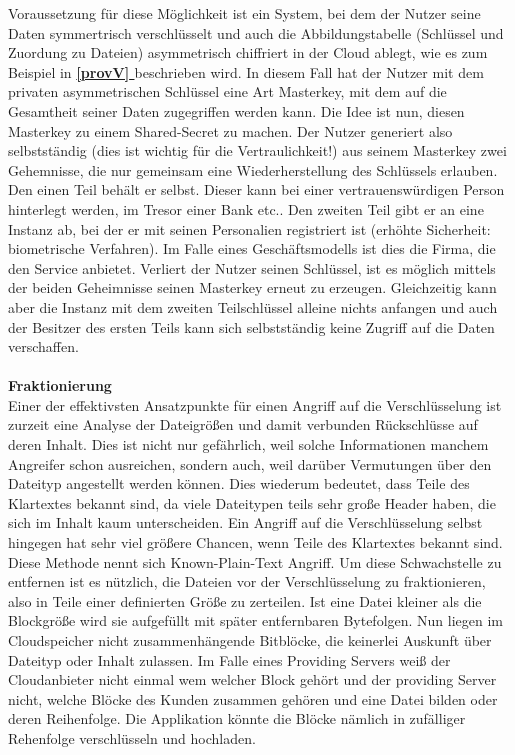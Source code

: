 \documentclass[13pt,a4paper,bibliography=totocnumbered,listof=totocnumbered]{scrartcl}
\newcommand*{\fullref}[1]{\textbf{\hyperref[{#1}]{\ref*{#1} \nameref*{#1}}}}
\begin{document}
Voraussetzung für diese Möglichkeit ist ein System, bei dem der Nutzer seine Daten symmertrisch verschlüsselt und auch die Abbildungstabelle (Schlüssel und Zuordung zu Dateien) asymmetrisch chiffriert in der Cloud ablegt, wie es zum Beispiel in \fullref{provV} beschrieben wird. In diesem Fall hat der Nutzer mit dem privaten asymmetrischen Schlüssel eine Art Masterkey, mit dem auf die Gesamtheit seiner Daten zugegriffen werden kann. Die Idee ist nun, diesen Masterkey zu einem Shared-Secret zu machen. Der Nutzer generiert also selbstständig (dies ist wichtig für die Vertraulichkeit!) aus seinem Masterkey zwei Gehemnisse, die nur gemeinsam eine Wiederherstellung des Schlüssels erlauben. Den einen Teil behält er selbst. Dieser kann bei einer vertrauenswürdigen Person hinterlegt werden, im Tresor einer Bank etc.. Den zweiten Teil gibt er an eine Instanz ab, bei der er mit seinen Personalien registriert ist (erhöhte Sicherheit: biometrische Verfahren). Im Falle eines Geschäftsmodells ist dies die Firma, die den Service anbietet. Verliert der Nutzer seinen Schlüssel, ist es möglich mittels der beiden Geheimnisse seinen Masterkey erneut zu erzeugen. Gleichzeitig kann aber die Instanz mit dem zweiten Teilschlüssel alleine nichts anfangen und auch der Besitzer des ersten Teils kann sich selbstständig keine Zugriff auf die Daten verschaffen. \cite{11}\\
\\\textbf{Fraktionierung}\\
Einer der effektivsten Ansatzpunkte für einen Angriff auf die Verschlüsselung ist zurzeit eine Analyse der Dateigrößen und damit verbunden Rückschlüsse auf deren Inhalt. Dies ist nicht nur gefährlich, weil solche Informationen manchem Angreifer schon ausreichen, sondern auch, weil darüber Vermutungen über den Dateityp angestellt werden können. Dies wiederum bedeutet, dass Teile des Klartextes bekannt sind, da viele Dateitypen teils sehr große Header haben, die sich im Inhalt kaum unterscheiden. Ein Angriff auf die Verschlüsselung selbst hingegen hat sehr viel größere Chancen, wenn Teile des Klartextes bekannt sind. Diese Methode nennt sich Known-Plain-Text Angriff. Um diese Schwachstelle zu entfernen ist es nützlich, die Dateien vor der Verschlüsselung zu fraktionieren, also in Teile einer definierten Größe zu zerteilen. Ist eine Datei kleiner als die Blockgröße wird sie aufgefüllt mit später entfernbaren Bytefolgen. Nun liegen im Cloudspeicher nicht zusammenhängende Bitblöcke, die keinerlei Auskunft über Dateityp oder Inhalt zulassen. Im Falle eines Providing Servers weiß der Cloudanbieter nicht einmal wem welcher Block gehört und der providing Server nicht, welche Blöcke des Kunden zusammen gehören und eine Datei bilden oder deren Reihenfolge. Die Applikation könnte die Blöcke nämlich in zufälliger Rehenfolge verschlüsseln und hochladen.\\
\end{document}

